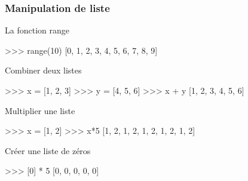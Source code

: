 \begin{frame}[fragile]
\frametitle{Manipulation de liste}

\begin{minipage}[t]{0.38\linewidth}
La fonction range
\end{minipage}\hfill
\begin{minipage}[t]{0.58\linewidth}
\vspace{-0.5cm}
\begin{GrayBox}[0.85\textwidth]
\begin{verbatimtab}[3]
>>> range(10)
[0, 1, 2, 3, 4, 5, 6, 7, 8, 9]
\end{verbatimtab}
\end{GrayBox}
\end{minipage}

\begin{minipage}[t]{0.38\linewidth}
Combiner deux listes
\end{minipage}\hfill
\begin{minipage}[t]{0.58\linewidth}
\vspace{-0.5cm}
\begin{GrayBox}[0.85\textwidth]
\begin{verbatimtab}[3]
>>> x = [1, 2, 3]
>>> y = [4, 5, 6]
>>> x + y
[1, 2, 3, 4, 5, 6]
\end{verbatimtab}
\end{GrayBox}
\end{minipage}

\begin{minipage}[t]{0.38\linewidth}
Multiplier une liste
\end{minipage}\hfill
\begin{minipage}[t]{0.58\linewidth}
\vspace{-0.5cm}
\begin{GrayBox}[0.85\textwidth]
\begin{verbatimtab}[3]
>>> x = [1, 2]
>>> x*5
[1, 2, 1, 2, 1, 2, 1, 2, 1, 2]
\end{verbatimtab}
\end{GrayBox}
\end{minipage}

\begin{minipage}[t]{0.38\linewidth}
Créer une liste de zéros
\end{minipage}\hfill
\begin{minipage}[t]{0.58\linewidth}
\vspace{-0.5cm}
\begin{GrayBox}[0.85\textwidth]
\begin{verbatimtab}[3]
>>> [0] * 5
[0, 0, 0, 0, 0]
\end{verbatimtab}
\end{GrayBox}
\end{minipage}
\end{frame}


